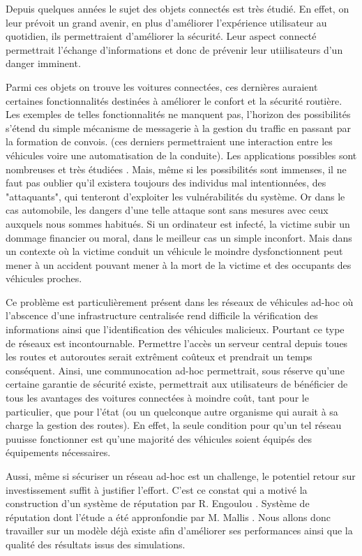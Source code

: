 Depuis quelques années le sujet des objets connectés est très étudié. En effet, on leur prévoit un grand avenir, en plus
d'améliorer l'expérience utilisateur au quotidien, ils permettraient d'améliorer la sécurité. Leur aspect connecté permettrait
l'échange d'informations et donc de prévenir leur utiilisateurs d'un danger imminent.

Parmi ces objets on trouve les voitures connectées, ces dernières auraient certaines fonctionnalités destinées à améliorer le
confort et la sécurité routière. Les exemples de telles fonctionnalités ne manquent pas, l'horizon des possibilités s'étend du
simple mécanisme de messagerie à la gestion du traffic en passant par la formation de convois. (ces derniers permettraient une
interaction entre les véhicules voire une automatisation de la conduite). Les applications possibles sont nombreuses et très
étudiées \cite{surveyIntelligentVehicule, fleetConvoyManagent}. Mais, même si les possibilités sont immenses, il ne faut pas
oublier qu'il existera toujours des individus mal intentionnées, des "attaquants", qui tenteront d'exploiter les vulnérabilités
du système. Or dans le cas automobile, les dangers d'une telle attaque sont sans mesures avec ceux auxquels nous sommes habitués.
Si un ordinateur est infecté, la victime subir un dommage financier ou moral, dans le meilleur cas un simple inconfort. Mais dans
un contexte où la victime conduit un véhicule le moindre dysfonctionnent peut mener à un accident pouvant mener à la mort de la
victime et des occupants des véhicules proches.

Ce problème est particulièrement présent dans les réseaux de véhicules ad-hoc où l'abscence d'une infrastructure centralisée rend
difficile la vérification des informations ainsi que l'identification des véhicules malicieux. Pourtant ce type de réseaux est
incontournable. Permettre l'accès un serveur central depuis toues les routes et autoroutes serait extrêment coûteux et prendrait
un temps conséquent. Ainsi, une communocation ad-hoc permettrait, sous réserve qu'une certaine garantie de sécurité existe,
permettrait aux utilisateurs de bénéficier de tous les avantages des voitures connectées à moindre coût, tant pour le particulier,
que pour l'état (ou un quelconque autre organisme qui aurait à sa charge la gestion des routes). En effet, la seule condition pour
qu'un tel réseau puuisse fonctionner est qu'une majorité des véhicules soient équipés des équipements nécessaires.

Aussi, même si sécuriser un réseau ad-hoc est un challenge, le potentiel retour sur investissement suffit à justifier l'effort.
C'est ce constat qui a motivé la construction d'un système de réputation par R. Engoulou \cite{REngoulou}. Système de réputation
dont l'étude a été appronfondie par M. Mallis \cite{MMallis}. Nous allons donc travailler sur un modèle déjà existe afin
d'améliorer ses performances ainsi que la qualité des résultats issus des simulations.

